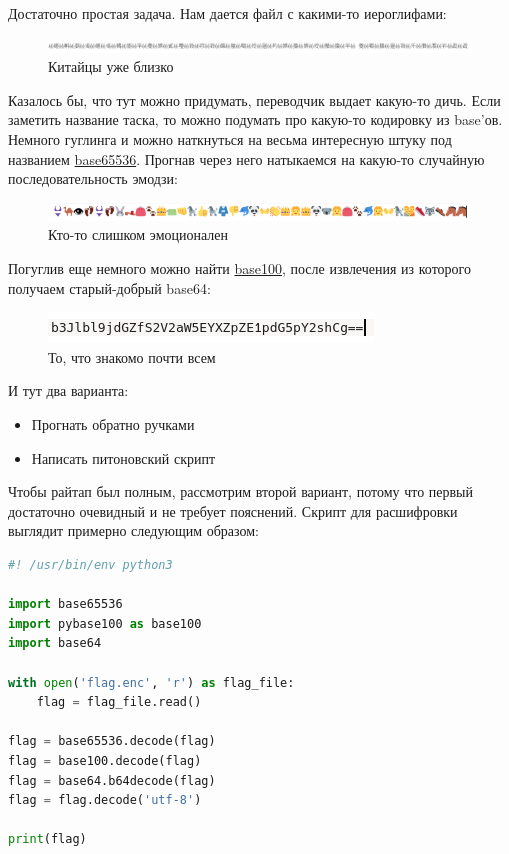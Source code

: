 \documentclass[idxtotoc,hyperref,openany,oneside]{files/crypto} %
\begin{document}
Достаточно простая задача. Нам дается файл с какими-то иероглифами:
\begin{figure}[H]
\begin{center}
\includegraphics[width=1.0\linewidth]{files/chinese}
\end{center}
\caption{Китайцы уже близко}
\label{fig:chinese}
\end{figure}
Казалось бы, что тут можно придумать, переводчик выдает какую-то дичь. Если заметить название таска, то можно подумать про какую-то кодировку из base'ов. Немного гуглинга и можно наткнуться на весьма интересную штуку под названием \href{https://github.com/qntm/base65536}{base65536}. Прогнав через него натыкаемся на какую-то случайную последовательность эмодзи:
\begin{figure}[H]
\begin{center}
\includegraphics[width=1.0\linewidth]{files/emoji}
\end{center}
\caption{Кто-то слишком эмоционален}
\label{fig:emoji}
\end{figure}
Погуглив еще немного можно найти \href{https://github.com/AdamNiederer/base100}{base100}, после извлечения из которого получаем старый-добрый base64:
\begin{figure}[H]
\begin{center}
\includegraphics[width=0.7\linewidth]{files/base64}
\end{center}
\caption{То, что знакомо почти всем}
\label{fig:base64}
\end{figure}
И тут два варианта:
\begin{itemize}
\item Прогнать обратно ручками
\item Написать питоновский скрипт
\end{itemize}
Чтобы райтап был полным, рассмотрим второй вариант, потому что первый достаточно очевидный и не требует пояснений. Скрипт для расшифровки выглядит примерно следующим образом:
\newpage
\begin{lstlisting}[language=Python, caption=Дешифровка флага]
#! /usr/bin/env python3

import base65536
import pybase100 as base100
import base64

with open('flag.enc', 'r') as flag_file:
    flag = flag_file.read()

flag = base65536.decode(flag)
flag = base100.decode(flag)
flag = base64.b64decode(flag)
flag = flag.decode('utf-8')

print(flag)
\end{lstlisting}
\end{document}

